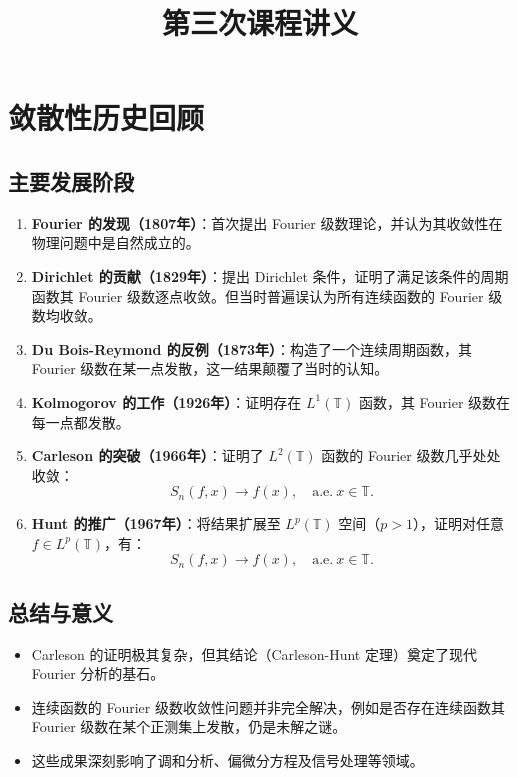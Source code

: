 \documentclass[12pt]{article}
\title{第三次课程讲义}
\author{}
\date{}
\begin{document}
	
	\maketitle
	
	\section{敛散性历史回顾}
	
	\subsection{主要发展阶段}
	\begin{enumerate}[leftmargin=2cm]
		\item \textbf{Fourier 的发现（1807年）}：首次提出 Fourier 级数理论，并认为其收敛性在物理问题中是自然成立的。
		
		\item \textbf{Dirichlet 的贡献（1829年）}：提出 Dirichlet 条件，证明了满足该条件的周期函数其 Fourier 级数逐点收敛。但当时普遍误认为所有连续函数的 Fourier 级数均收敛。
		
		\item \textbf{Du Bois-Reymond 的反例（1873年）}：构造了一个连续周期函数，其 Fourier 级数在某一点发散，这一结果颠覆了当时的认知。
		
		\item \textbf{Kolmogorov 的工作（1926年）}：证明存在 $L^1(\mathbb{T})$ 函数，其 Fourier 级数在每一点都发散。
		
		\item \textbf{Carleson 的突破（1966年）}：证明了 $L^2(\mathbb{T})$ 函数的 Fourier 级数几乎处处收敛：
		\[
		S_n(f,x) \rightarrow f(x), \quad \text{a.e.} \ x \in \mathbb{T}.
		\]
		
		\item \textbf{Hunt 的推广（1967年）}：将结果扩展至 $L^p(\mathbb{T})$ 空间（$p>1$），证明对任意 $f \in L^p(\mathbb{T})$，有：
		\[
		S_n(f,x) \rightarrow f(x), \quad \text{a.e.} \ x \in \mathbb{T}.
		\]
	\end{enumerate}
	
	\subsection{总结与意义}
	\begin{itemize}
		\item Carleson 的证明极其复杂，但其结论（Carleson-Hunt 定理）奠定了现代 Fourier 分析的基石。
		\item 连续函数的 Fourier 级数收敛性问题并非完全解决，例如是否存在连续函数其 Fourier 级数在某个正测集上发散，仍是未解之谜。
		\item 这些成果深刻影响了调和分析、偏微分方程及信号处理等领域。
	\end{itemize}
	
\end{document}
